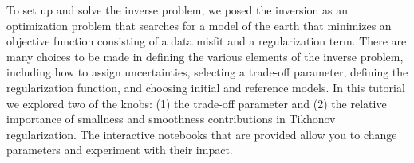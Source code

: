 \documentclass[11pt,oneside]{article}
\begin{document}
To set up and solve the inverse problem,  we posed the inversion as an optimization problem that searches for a model of the earth that minimizes an objective function consisting of a data misfit and a regularization term. There are many choices to be made in defining the various elements of the inverse problem, including how to assign uncertainties, selecting a trade-off parameter, defining the regularization function, and choosing initial and reference models. In this tutorial we explored two of the knobs: (1) the trade-off parameter and (2) the relative importance of smallness and smoothness contributions in Tikhonov regularization. The interactive notebooks that are provided allow you to change parameters and experiment with their impact.



\clearpage

\end{document}
